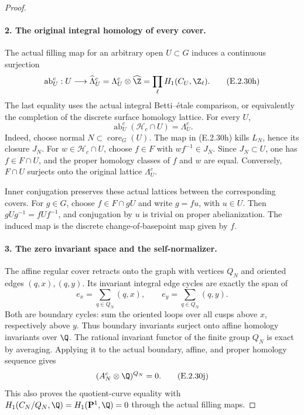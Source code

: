 \begin{proof}
\paragraph{2. The original integral homology of every cover.}
The actual filling map for an arbitrary open \(U\subset G\)
induces a continuous surjection
\[
 \operatorname{ab}_U^c:U\longrightarrow
 \widehat\Lambda_U^c=\Lambda_U^c\otimes\widehat\Z
                  =\prod_\ell H_1(C_U,\Z_\ell).
\tag{E.2.30h}
\]
The last equality uses the actual integral Betti--\'{e}tale
comparison, or equivalently the completion of the discrete
surface homology lattice. For every \(U\),
\[
 \operatorname{ab}_U^c(\mathcal H_c\cap U)=\Lambda_U^c.
\tag{E.2.30i}
\]
Indeed, choose normal \(N\subset\operatorname{core}_G(U)\).
The map in (E.2.30h) kills \(L_N\), hence its closure \(J_N\).
For \(w\in\mathcal H_c\cap U\), choose \(f\in F\) with
\(wf^{-1}\in J_N\). Since \(J_N\subset U\), one has
\(f\in F\cap U\), and the proper homology classes of \(f\)
and \(w\) are equal. Conversely, \(F\cap U\) surjects onto
the original lattice \(\Lambda_U^c\).

Inner conjugation preserves these actual lattices between the
corresponding covers. For \(g\in G\), choose
\(f\in F\cap gU\) and write \(g=fu\), with \(u\in U\).
Then \(gUg^{-1}=fUf^{-1}\), and conjugation by \(u\) is
trivial on proper abelianization. The induced map is the
discrete change-of-basepoint map given by \(f\).

\paragraph{3. The zero invariant space and the self-normalizer.}
The affine regular cover retracts onto the graph with vertices
\(Q_N\) and oriented edges \((q,x),(q,y)\). Its invariant
integral edge cycles are exactly the span of
\[
 e_x=\sum_{q\in Q_N}(q,x),\qquad
 e_y=\sum_{q\in Q_N}(q,y).
\]
Both are boundary cycles: sum the oriented loops over all
cusps above \(x\), respectively above \(y\). Thus boundary
invariants surject onto affine homology invariants over \(\Q\).
The rational invariant functor of the finite group \(Q_N\)
is exact by averaging. Applying it to the actual boundary,
affine, and proper homology sequence gives
\[
 (A_N^c\otimes\Q)^{Q_N}=0.
\tag{E.2.30j}
\]
This also proves the quotient-curve equality with
\(H_1(C_N/Q_N,\Q)=H_1(\mathbf P^1,\Q)=0\) through
the actual filling maps.


\end{proof}
